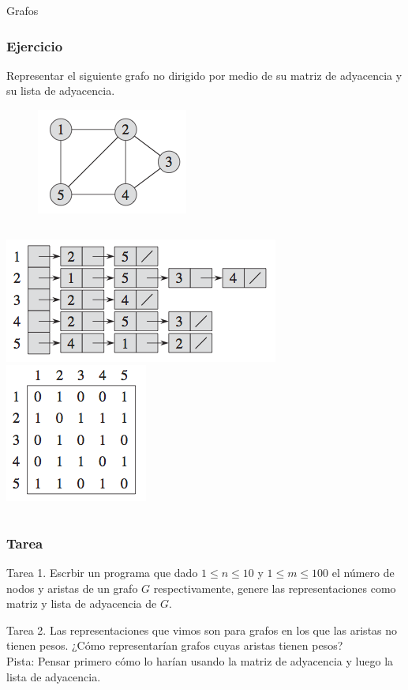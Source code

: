\documentclass{beamer}
\begin{document}
\begin{section}{Grafos}
	\begin{frame}
		\frametitle{Ejercicio}
		Representar el siguiente grafo no dirigido por medio de su matriz de adyacencia y su lista de adyacencia.
		\begin{figure}
			\includegraphics[height = 0.3\textheight]{ejemplo_graph.png}
		\end{figure}
		\pause
		\begin{columns}
				\includegraphics[height = 0.3\textheight]{lista_graph.png}
				\includegraphics[height = 0.3\textheight]{matriz_graph.png}
		\end{columns}		
	\end{frame}

	\begin{frame}
		\frametitle{Tarea}
		\begin{alertblock}{Tarea 1.}
			Escrbir un programa que dado $1 \leq n \leq 10$ y $1 \leq m \leq 100$ el número de nodos y aristas de un grafo $G$ respectivamente, genere las representaciones como matriz y lista de adyacencia de $G$.
		\end{alertblock}
		
		\begin{alertblock}{Tarea 2.}
			Las representaciones que vimos son para grafos en los que las aristas no tienen pesos. ¿Cómo representarían grafos cuyas aristas tienen pesos?\\
			Pista: Pensar primero cómo lo harían usando la matriz de adyacencia y luego la lista de adyacencia.
		\end{alertblock}
	\end{frame}
	

\end{section}
\end{document}
